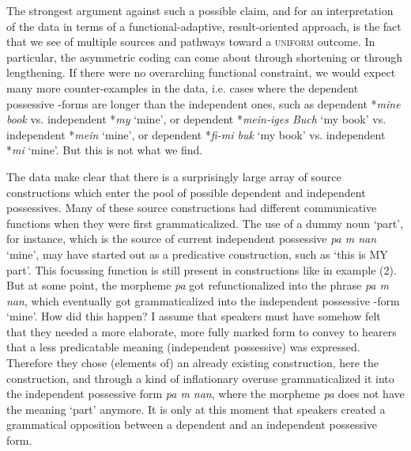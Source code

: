 \documentclass[output=paper]{langsci/langscibook}
\begin{document}
The strongest argument against such a possible claim, and for an interpretation of the data in terms of a functional-adaptive, result-oriented approach, is the fact that we see  of multiple sources and pathways toward a \textsc{uniform} outcome. In particular, the asymmetric coding can come about through shortening or through lengthening. If there were no overarching functional constraint, we would expect many more counter-examples in the data, i.e. cases where the dependent possessive -forms are longer than the independent ones, such as dependent *\textit{mine book} vs. independent *\textit{my} ‘mine’, or  dependent *\textit{mein-iges Buch} ‘my book’ vs. independent *\textit{mein} ‘mine’, or  dependent *\textit{fi-mi buk} ‘my book’ vs. independent *\textit{mi} ‘mine’. But this is not what we find.

The  data make clear that there is a surprisingly large array of source constructions which enter the pool of possible dependent and independent possessives. Many of these source constructions had different communicative functions when they were first grammaticalized. The use of a dummy noun ‘part’, for instance, which is the source of current  independent possessive \textit{pa m nan} ‘mine’, may have started out as a predicative  construction, such as ‘this is MY part’. This focussing function is still present in constructions like in example (2). But at some point, the morpheme \textit{pa} got refunctionalized into the phrase \textit{pa m nan}, which eventually got grammaticalized into the independent possessive -form ‘mine’. How did this happen? I assume that speakers must have somehow felt that they needed a more elaborate, more fully marked form to convey to hearers that a less predicatable meaning (independent possessive) was expressed. Therefore they chose (elements of) an already existing construction, here the  construction, and through a kind of inflationary overuse grammaticalized it into the independent possessive form \textit{pa m nan}, where the morpheme \textit{pa} does not have the meaning ‘part’ anymore. It is only at this moment that speakers created a grammatical opposition between a dependent and an independent possessive form. 
\end{document}
